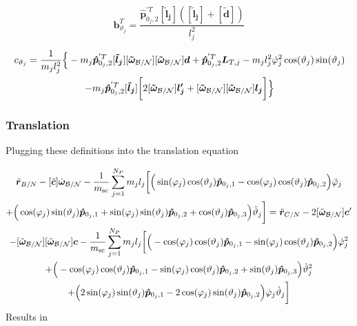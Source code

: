 \begin{equation}
	\bm b_{\vartheta_j}^{T} = \frac{\bm{\hat{p}}_{0_j,2}^{'T} [\bm{\tilde{l}_j}]( [\bm{\tilde{l}_j}] + [\bm{\tilde{d}}])}{ l_j^2}
	\label{eq:BSM11}
\end{equation}

\begin{multline}
	c_{\vartheta_j} = \frac{1}{m_j l_j^2}\Big\{-m_{j} \bm{\hat{p}}_{0_j,2}^{'T}[\bm{\tilde{l}_j}][\bm{\tilde{\omega}}_{\cal B/N}][\bm{\tilde{\omega}}_{\cal B/N}] \bm{d}+\bm{\hat{p}}_{0_j,2}^{'T} \bm{L}_{T,j}-m_j l_j^2\dot{\varphi}_j^2\cos(\vartheta_j)\sin(\vartheta_j)\\- m_j \bm{\hat{p}}_{0_j,2}^{'T} [\bm{\tilde{l}_j}]\bigg[2[\bm{\tilde{\omega}}_{\cal B/N}] \bm{l_j'}+[\bm{\tilde{\omega}}_{\cal B/N}][\bm{\tilde{\omega}}_{\cal B/N}] \bm{l_j}\bigg] \Big\}
	\label{eq:BSM12}
\end{multline}

\subsubsection{Translation}

Plugging these definitions into the translation equation

\begin{multline}
	\ddot{\bm r}_{B/N}-[\tilde{\bm{c}}] \dot{\bm\omega}_{\cal B/N}-\frac{1}{m_{\text{sc}}}\sum_{j=1}^{N_{P}}m_j l_j \bigg[
	\Big(\sin(\varphi_j)\cos(\vartheta_j)\bm{\hat{p}}_{0_j,1}-\cos(\varphi_j)\cos(\vartheta_j)\bm{\hat{p}}_{0_j,2}\Big)\ddot{\varphi}_j \\+\Big(\cos(\varphi_j)\sin(\vartheta_j)\bm{\hat{p}}_{0_j,1}+\sin(\varphi_j)\sin(\vartheta_j)\bm{\hat{p}}_{0_j,2}+\cos(\vartheta_j)\bm{\hat{p}}_{0_j,3}\Big)\ddot{\vartheta}_j
	\bigg]= \ddot{\bm r}_{C/N} 	- 2[\tilde{\bm\omega}_{\cal B/N}] \bm c'
	\\-[\tilde{\bm\omega}_{\cal B/N}][\tilde{\bm\omega}_{\cal B/N}]\bm{c}
	-\frac{1}{m_{\text{sc}}}\sum_{j=1}^{N_{P}}m_j l_j \bigg[
	\Big(-\cos(\varphi_j)\cos(\vartheta_j)\bm{\hat{p}}_{0_j,1}-\sin(\varphi_j)\cos(\vartheta_j)\bm{\hat{p}}_{0_j,2}\Big)\dot{\varphi}_j^2
	\\+\Big(-\cos(\varphi_j)\cos(\vartheta_j)\bm{\hat{p}}_{0_j,1}-\sin(\varphi_j)\cos(\vartheta_j)\bm{\hat{p}}_{0_j,2}+\sin(\vartheta_j)\bm{\hat{p}}_{0_j,3} \Big)\dot{\vartheta}_j^2 \\+
	\Big(2\sin(\varphi_j)\sin(\vartheta_j)\bm{\hat{p}}_{0_j,1} -2\cos(\varphi_j)\sin(\vartheta_j)\bm{\hat{p}}_{0_j,2}\Big)\dot{\varphi}_j\dot{\vartheta}_j
	\bigg]
	\label{eq:Rbddot4_bis}
\end{multline}
Results in

